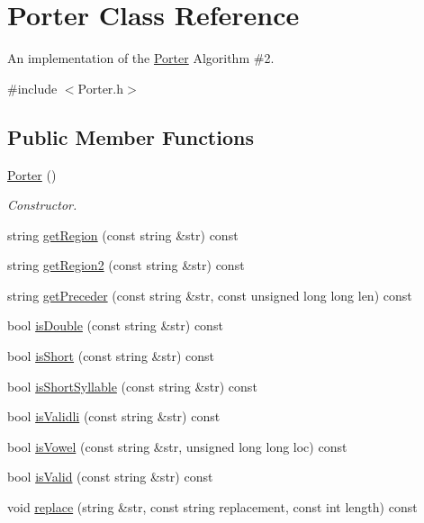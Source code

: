 \hypertarget{class_porter}{}\section{Porter Class Reference}
\label{class_porter}


An implementation of the \hyperlink{class_porter}{Porter} Algorithm \#2.  




{\ttfamily \#include $<$Porter.\+h$>$}

\subsection*{Public Member Functions}
\begin{DoxyCompactItemize}
\item 
\hyperlink{class_porter_a04be3733ab5109a1cf6131de05cc5961}{Porter} ()
\begin{DoxyCompactList}\small\item\em Constructor. \end{DoxyCompactList}\item 
string \hyperlink{class_porter_a9e33d06b477f04db7c8cee07e85e8bcb}{get\+Region} (const string \&str) const
\item 
string \hyperlink{class_porter_a1420c413bb564a22e4fc0c6627e1870b}{get\+Region2} (const string \&str) const
\item 
string \hyperlink{class_porter_a2000ce7eeabb3a7d9593fa9790a4fdc4}{get\+Preceder} (const string \&str, const unsigned long long len) const
\item 
bool \hyperlink{class_porter_a7c8a4b3b6103ce655e8ffc8a3eba1897}{is\+Double} (const string \&str) const
\item 
bool \hyperlink{class_porter_a35b1cc5606d4e78d1f69ac4037fdde87}{is\+Short} (const string \&str) const
\item 
bool \hyperlink{class_porter_a36e6678f68a4cc29371cc0111a8c8860}{is\+Short\+Syllable} (const string \&str) const
\item 
bool \hyperlink{class_porter_ac53ad85d5d3178b72178a4d89137b55e}{is\+Validli} (const string \&str) const
\item 
bool \hyperlink{class_porter_ab16d2762c47b86b9a161be3d2c44203e}{is\+Vowel} (const string \&str, unsigned long long loc) const
\item 
bool \hyperlink{class_porter_a9da79dd6524131e703619d3e301e896a}{is\+Valid} (const string \&str) const
\item 
void \hyperlink{class_porter_aba12641d0e612b264097a35e4f2ffb45}{replace} (string \&str, const string replacement, const int length) const

\end{DoxyCompactItemize}
